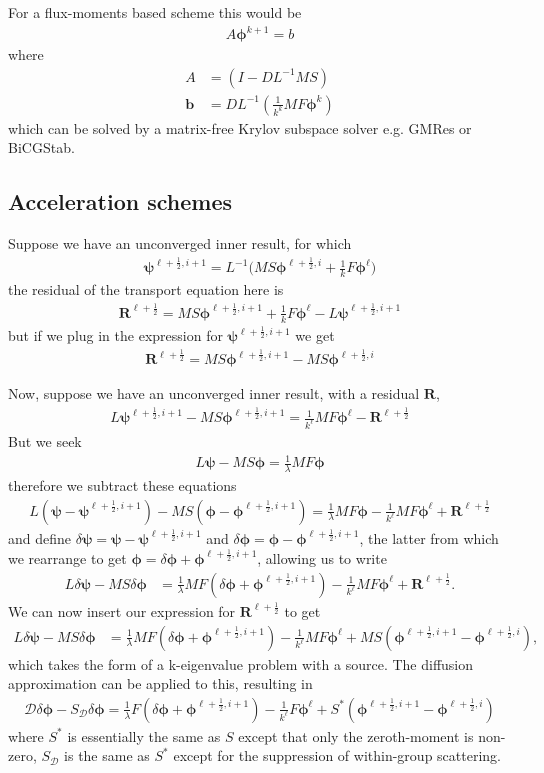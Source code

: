 \documentclass[11pt,letterpaper,notitlepage]{article}
\newcommand{\beqn}{\begin{equation}
		\begin{aligned}}
\newcommand{\eeqn}{\end{aligned}
\end{equation}}
\numberwithin{equation}{section}
\newcommand{\Linv}{L^{-1}}
\newcommand{\bphi}{\boldsymbol{\phi}}
\newcommand{\bpsi}{\boldsymbol{\psi}}
\newcommand{\half}{\frac{1}{2}}
\begin{document}
For a flux-moments based scheme this would be
\beqn 
A \bphi^{k+1} = b
\eeqn 
where 
\beqn 
A &= (I-D\Linv MS) \\
\mathbf{b} &= D\Linv (\frac{1}{k^k} MF\bphi^{k})
\eeqn 
which can be solved by a matrix-free Krylov subspace solver e.g. GMRes or BiCGStab.

\subsection{Acceleration schemes}
Suppose we have an unconverged inner result, for which
\beqn 
\bpsi^{\ell+\half,i+1} = \Linv \biggr(
MS\bphi^{\ell+\half, i} + \frac{1}{k}F\bphi^\ell
\biggr)
\eeqn 
the residual of the transport equation here is
\beqn
\mathbf{R}^{\ell+\half} = MS\bphi^{\ell+\half,i+1} + \frac{1}{k}F\bphi^\ell - L \bpsi^{\ell+\half,i+1}
\eeqn 
but if we plug in the expression for $\bpsi^{\ell+\half,i+1}$ we get
\beqn 
\mathbf{R}^{\ell+\half} = MS\bphi^{\ell+\half,i+1} - MS\bphi^{\ell+\half,i}
\eeqn 


Now, suppose we have an unconverged inner result, with a residual $\mathbf{R}$,
\beqn 
L \bpsi^{\ell+\half,i+1} - MS\bphi^{\ell+\half,i+1} = \frac{1}{k^\ell} MF\bphi^\ell - \mathbf{R}^{\ell+\half}
\eeqn 
But we seek
\beqn 
L \bpsi - MS\bphi = \frac{1}{\lambda} MF\bphi
\eeqn 
therefore we subtract these equations
\beqn 
L(\bpsi-\bpsi^{\ell+\half,i+1}) -MS(\bphi - \bphi^{\ell+\half,i+1})= \frac{1}{\lambda} MF\bphi - \frac{1}{k^\ell} MF\bphi^\ell + \mathbf{R}^{\ell + \half}
\eeqn
and define $\delta \bpsi = \bpsi - \bpsi^{\ell+\half,i+1}$ and $\delta \bphi = \bphi - \bphi^{\ell+\half,i+1}$, the latter from which we rearrange to get $\bphi = \delta \bphi + \bphi^{\ell+\half,i+1}$, allowing us to write 
\beqn 
L\delta \bpsi - MS\delta \bphi &= \frac{1}{\lambda}MF(\delta \bphi + \bphi^{\ell+\half,i+1})  - \frac{1}{k^\ell} MF\bphi^\ell + \mathbf{R}^{\ell + \half}.
\eeqn 
We can now insert our expression for $\mathbf{R}^{\ell + \half}$ to get
\beqn 
L\delta \bpsi - MS\delta \bphi &= \frac{1}{\lambda}MF(\delta \bphi + \bphi^{\ell+\half,i+1})  - \frac{1}{k^\ell} MF\bphi^\ell + MS(\bphi^{\ell+\half,i+1} - \bphi^{\ell+\half,i}),
\eeqn
which takes the form of a k-eigenvalue problem with a source. The diffusion approximation can be applied to this, resulting in
\beqn 
\mathcal{D} \delta \bphi - S_{\mathcal{D}} \delta \bphi = \frac{1}{\lambda}F(\delta \bphi + \bphi^{\ell+\half,i+1}) - \frac{1}{k^\ell} F\bphi^\ell + S^*(\bphi^{\ell+\half,i+1} - \bphi^{\ell+\half,i})
\eeqn 
where $S^*$ is essentially the same as $S$ except that only the zeroth-moment is non-zero, $S_{\mathcal{D}}$ is the same as $S^*$ except for the suppression of within-group scattering.
\end{document}

